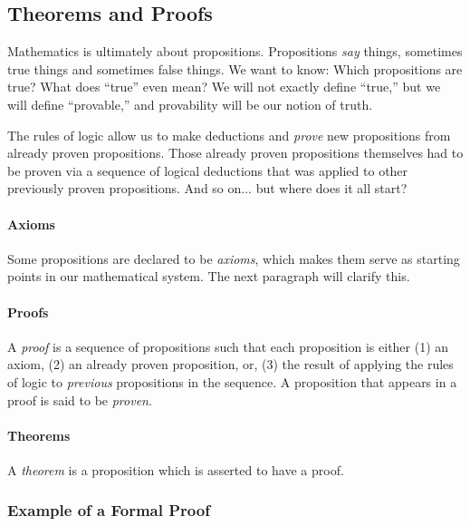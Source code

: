 \documentclass[12pt]{article}
\newcommand{\settext}[2]{\left\{ #1\ |\ \text{#2} \right\}}
\begin{document}
\subsection{Theorems and Proofs}

Mathematics is ultimately about propositions.
Propositions \emph{say} things, sometimes true things and sometimes false things.
We want to know: Which propositions are true? What does ``true'' even mean?
We will not exactly define ``true,'' but we will define ``provable,''
and provability will be our notion of truth.

The rules of logic allow us to make deductions and \emph{prove} new propositions
from already proven propositions.
Those already proven propositions themselves had to be proven via a sequence of logical deductions
that was applied to other previously proven propositions.
And so on...
but where does it all start?

\paragraph{Axioms}
Some propositions are declared to be \emph{axioms},
which makes them serve as starting points in our mathematical system.
The next paragraph will clarify this.

\paragraph{Proofs}
A \emph{proof} is a sequence of propositions such that each proposition is either
(1) an axiom, 
(2) an already proven proposition,
or, (3) the result of applying the rules of logic to \emph{previous} propositions in the sequence.
A proposition that appears in a proof is said to be \emph{proven}.


\paragraph{Theorems}
A \emph{theorem} is a proposition which is asserted to have a proof.

\subsubsection{Example of a Formal Proof}


\def\ES{\settext{x}{$x\neq x$}}
\end{document}
